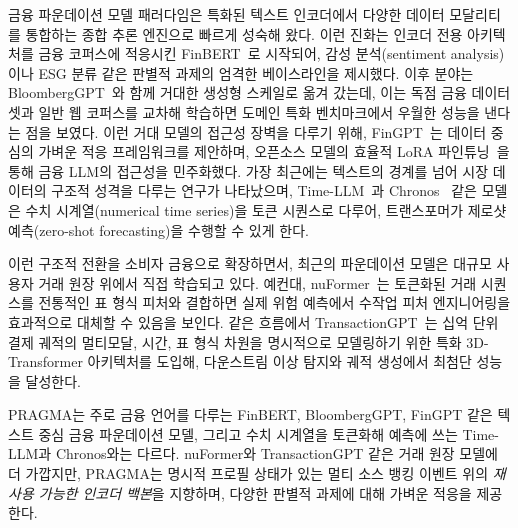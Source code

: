 금융 파운데이션 모델 패러다임은 특화된 텍스트 인코더에서 다양한 데이터 모달리티를 통합하는 종합 추론 엔진으로 빠르게 성숙해 왔다.
이런 진화는 인코더 전용 아키텍처를 금융 코퍼스에 적응시킨 FinBERT~\citep{yang2020finbert}로 시작되어, 감성 분석(sentiment analysis)이나 ESG 분류 같은 판별적 과제의 엄격한 베이스라인을 제시했다.
이후 분야는 BloombergGPT~\citep{wu2023bloomberggpt}와 함께 거대한 생성형 스케일로 옮겨 갔는데, 이는 독점 금융 데이터셋과 일반 웹 코퍼스를 교차해 학습하면 도메인 특화 벤치마크에서 우월한 성능을 낸다는 점을 보였다.
이런 거대 모델의 접근성 장벽을 다루기 위해, FinGPT~\citep{yang2023fingpt}는 데이터 중심의 가벼운 적응 프레임워크를 제안하며, 오픈소스 모델의 효율적 LoRA 파인튜닝~\citep{hu2022lora}을 통해 금융 LLM의 접근성을 민주화했다.
가장 최근에는 텍스트의 경계를 넘어 시장 데이터의 구조적 성격을 다루는 연구가 나타났으며, Time-LLM~\citep{jin2024timellm}과 Chronos~\citep{ansari2024chronos} 같은 모델은 수치 시계열(numerical time series)을 토큰 시퀀스로 다루어, 트랜스포머가 제로샷 예측(zero-shot forecasting)을 수행할 수 있게 한다.

이런 구조적 전환을 소비자 금융으로 확장하면서, 최근의 파운데이션 모델은 대규모 사용자 거래 원장 위에서 직접 학습되고 있다.
예컨대, nuFormer~\citep{braithwaite2025your}는 토큰화된 거래 시퀀스를 전통적인 표 형식 피처와 결합하면 실제 위험 예측에서 수작업 피처 엔지니어링을 효과적으로 대체할 수 있음을 보인다.
같은 흐름에서 TransactionGPT~\citep{dou2025transactiongpt}는 십억 단위 결제 궤적의 멀티모달, 시간, 표 형식 차원을 명시적으로 모델링하기 위한 특화 3D-Transformer 아키텍처를 도입해, 다운스트림 이상 탐지와 궤적 생성에서 최첨단 성능을 달성한다.

PRAGMA는 주로 금융 언어를 다루는 FinBERT, BloombergGPT, FinGPT 같은 텍스트 중심 금융 파운데이션 모델, 그리고 수치 시계열을 토큰화해 예측에 쓰는 Time-LLM과 Chronos와는 다르다.
nuFormer와 TransactionGPT 같은 거래 원장 모델에 더 가깝지만, PRAGMA는 명시적 프로필 상태가 있는 멀티 소스 뱅킹 이벤트 위의 \emph{재사용 가능한 인코더 백본}을 지향하며, 다양한 판별적 과제에 대해 가벼운 적응을 제공한다.
